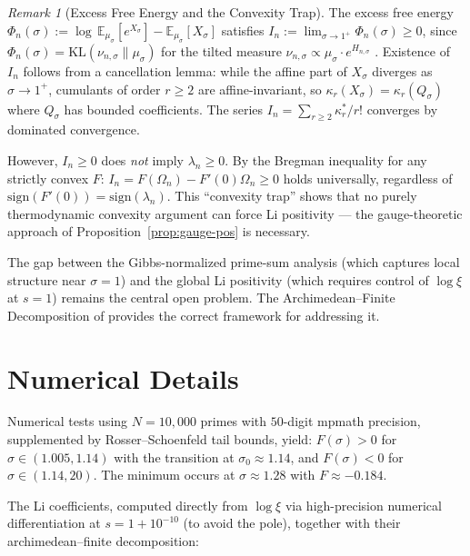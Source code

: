 \documentclass[12pt,a4paper]{article}
\theoremstyle{definition}
\theoremstyle{remark}
\newtheorem{remark}[theorem]{Remark}
\begin{document}
\begin{remark}[Excess Free Energy and the Convexity Trap]\label{rem:convexity-trap}
The excess free energy $\Phi_n(\sigma) := \log\,\mathbb{E}_{\mu_\sigma}[e^{X_\sigma}] - \mathbb{E}_{\mu_\sigma}[X_\sigma]$ satisfies $I_n := \lim_{\sigma \to 1^+} \Phi_n(\sigma) \ge 0$, since $\Phi_n(\sigma) = \mathrm{KL}(\nu_{n,\sigma}\|\mu_\sigma)$ for the tilted measure $\nu_{n,\sigma} \propto \mu_\sigma \cdot e^{H_{n,\sigma}}$ \cite{DonskerVaradhan1975}. Existence of $I_n$ follows from a cancellation lemma: while the affine part of $X_\sigma$ diverges as $\sigma \to 1^+$, cumulants of order $r \ge 2$ are affine-invariant, so $\kappa_r(X_\sigma) = \kappa_r(Q_\sigma)$ where $Q_\sigma$ has bounded coefficients. The series $I_n = \sum_{r \ge 2} \kappa_r^*/r!$ converges by dominated convergence.

However, $I_n \ge 0$ does \emph{not} imply $\lambda_n \ge 0$. By the Bregman inequality for any strictly convex $F$: $I_n = F(\Omega_n) - F'(0)\Omega_n \ge 0$ holds universally, regardless of $\mathrm{sign}(F'(0)) = \mathrm{sign}(\lambda_n)$. This ``convexity trap'' shows that no purely thermodynamic convexity argument can force Li positivity --- the gauge-theoretic approach of Proposition~\ref{prop:gauge-pos} is necessary.
\end{remark}

The gap between the Gibbs-normalized prime-sum analysis (which captures local structure near $\sigma = 1$) and the global Li positivity (which requires control of $\log\xi$ at $s=1$) remains the central open problem. The Archimedean--Finite Decomposition of  provides the correct framework for addressing it.

\appendix
\section{Numerical Details}\label{sec:numerics}
Numerical tests using $N=10{,}000$ primes with $50$-digit mpmath precision, supplemented by Rosser--Schoenfeld tail bounds, yield: $F(\sigma) > 0$ for $\sigma \in (1.005, 1.14)$ with the transition at $\sigma_0 \approx 1.14$, and $F(\sigma) < 0$ for $\sigma \in (1.14, 20)$. The minimum occurs at $\sigma \approx 1.28$ with $F \approx -0.184$.

The Li coefficients, computed directly from $\log\xi$ via high-precision numerical differentiation at $s = 1 + 10^{-10}$ (to avoid the pole), together with their archimedean--finite decomposition:
\end{document}
